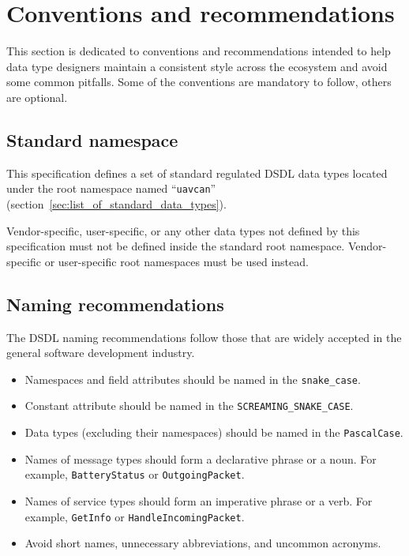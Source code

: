 \section{Conventions and recommendations}

This section is dedicated to conventions and recommendations
intended to help data type designers maintain a consistent style across the ecosystem
and avoid some common pitfalls.
Some of the conventions are mandatory to follow, others are optional.

\subsection{Standard namespace}

This specification defines a set of standard regulated DSDL data types located under
the root namespace named ``\verb"uavcan"'' (section~\ref{sec:list_of_standard_data_types}).

Vendor-specific, user-specific, or any other data types not defined by this specification
must not be defined inside the standard root namespace.
Vendor-specific or user-specific root namespaces must be used instead.

\subsection{Naming recommendations}

The DSDL naming recommendations follow those that are widely accepted in the general software development industry.

\begin{itemize}
    \item Namespaces and field attributes should be named in the \verb|snake_case|.
    \item Constant attribute should be named in the \verb|SCREAMING_SNAKE_CASE|.
    \item Data types (excluding their namespaces) should be named in the \verb|PascalCase|.
    \item Names of message types should form a declarative phrase or a noun. For example,
    \verb|BatteryStatus| or \verb|OutgoingPacket|.
    \item Names of service types should form an imperative phrase or a verb. For example,
    \verb|GetInfo| or \verb|HandleIncomingPacket|.
    \item Avoid short names, unnecessary abbreviations, and uncommon acronyms.
\end{itemize}

